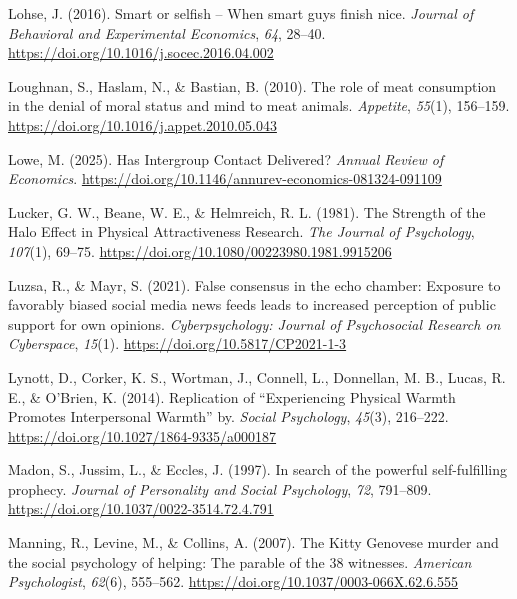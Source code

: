 \documentclass[
  letterpaper,
]{book}
\newlength{\cslhangindent}
\newenvironment{CSLReferences}[2] %
 {\begin{list}{}{%
  \setlength{\itemindent}{0pt}
  \setlength{\leftmargin}{0pt}
  \setlength{\parsep}{0pt}
  \ifodd #1
   \setlength{\leftmargin}{\cslhangindent}
   \setlength{\itemindent}{-1\cslhangindent}
  \fi
  \setlength{\itemsep}{#2\baselineskip}}}
 {\end{list}}
\begin{document}
\begin{CSLReferences}{1}{0}
Lohse, J. (2016). Smart or selfish -- {When} smart guys finish nice.
\emph{Journal of Behavioral and Experimental Economics}, \emph{64},
28--40. \url{https://doi.org/10.1016/j.socec.2016.04.002}

Loughnan, S., Haslam, N., \& Bastian, B. (2010). {The role of meat
consumption in the denial of moral status and mind to meat animals}.
\emph{{Appetite}}, \emph{55}(1), 156--159.
\url{https://doi.org/10.1016/j.appet.2010.05.043}

Lowe, M. (2025). Has {Intergroup} {Contact} {Delivered}? \emph{Annual
Review of Economics}.
\url{https://doi.org/10.1146/annurev-economics-081324-091109}

Lucker, G. W., Beane, W. E., \& Helmreich, R. L. (1981). The {Strength}
of the {Halo} {Effect} in {Physical} {Attractiveness} {Research}.
\emph{The Journal of Psychology}, \emph{107}(1), 69--75.
\url{https://doi.org/10.1080/00223980.1981.9915206}

Luzsa, R., \& Mayr, S. (2021). False consensus in the echo chamber:
{Exposure} to favorably biased social media news feeds leads to
increased perception of public support for own opinions.
\emph{Cyberpsychology: Journal of Psychosocial Research on Cyberspace},
\emph{15}(1). \url{https://doi.org/10.5817/CP2021-1-3}

Lynott, D., Corker, K. S., Wortman, J., Connell, L., Donnellan, M. B.,
Lucas, R. E., \& O'Brien, K. (2014). Replication of {``{Experiencing}
{Physical} {Warmth} {Promotes} {Interpersonal} {Warmth}''} by.
\emph{Social Psychology}, \emph{45}(3), 216--222.
\url{https://doi.org/10.1027/1864-9335/a000187}

Madon, S., Jussim, L., \& Eccles, J. (1997). In search of the powerful
self-fulfilling prophecy. \emph{Journal of Personality and Social
Psychology}, \emph{72}, 791--809.
\url{https://doi.org/10.1037/0022-3514.72.4.791}

Manning, R., Levine, M., \& Collins, A. (2007). The {Kitty} {Genovese}
murder and the social psychology of helping: {The} parable of the 38
witnesses. \emph{American Psychologist}, \emph{62}(6), 555--562.
\url{https://doi.org/10.1037/0003-066X.62.6.555}


\end{CSLReferences}
\end{document}

